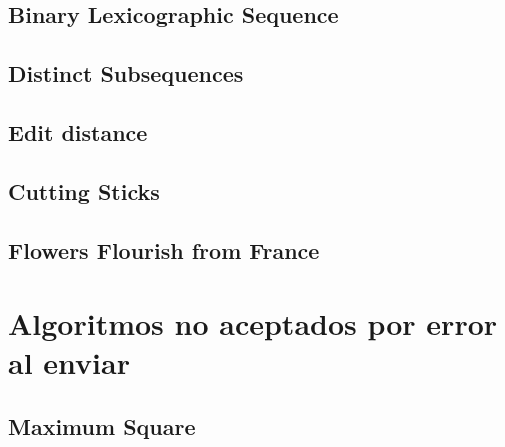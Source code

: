 \newpage
\section{Binary Lexicographic Sequence}


\newpage
\section{Distinct Subsequences}


\newpage
\section{Edit distance}


\newpage
\section{Cutting Sticks}


\newpage
\section{Flowers Flourish from France}



\chapter{Algoritmos no aceptados por error al enviar}


\newpage
\section{Maximum Square}
